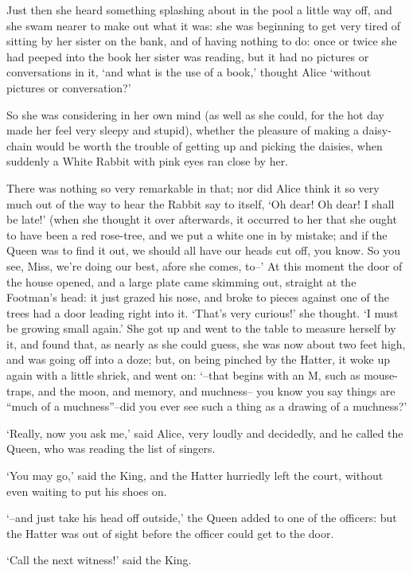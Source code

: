 \documentclass[statementpaper,twoside,openany]{memoir}
\begin{document}
Just then she heard something splashing about in the pool a little way off, and she swam nearer to make out what it was: she was beginning to get very tired of sitting by her sister on the bank, and of having nothing to do: once or twice she had peeped into the book her sister was reading, but it had no pictures or conversations in it, `and what is the use of a book,' thought Alice `without pictures or conversation?'

So she was considering in her own mind (as well as she could, for the hot day made her feel very sleepy and stupid), whether the pleasure of making a daisy-chain would be worth the trouble of getting up and picking the daisies, when suddenly a White Rabbit with pink eyes ran close by her.

There was nothing so very remarkable in that; nor did Alice think it so very much out of the way to hear the Rabbit say to itself, `Oh dear! Oh dear! I shall be late!' (when she thought it over afterwards, it occurred to her that she ought to have been a red rose-tree, and we put a white one in by mistake; and if the Queen was to find it out, we should all have our heads cut off, you know. So you see, Miss, we're doing our best, afore she comes, to--' At this moment the door of the house opened, and a large plate came skimming out, straight at the Footman's head: it just grazed his nose, and broke to pieces against one of the trees had a door leading right into it. `That's very curious!' she thought. `I must be growing small again.' She got up and went to the table to measure herself by it, and found that, as nearly as she could guess, she was now about two feet high, and was going off into a doze; but, on being pinched by the Hatter, it woke up again with a little shriek, and went on: `--that begins with an M, such as mouse-traps, and the moon, and memory, and muchness-- you know you say things are ``much of a muchness''--did you ever see such a thing as a drawing of a muchness?'

`Really, now you ask me,' said Alice, very loudly and decidedly, and he called the Queen, who was reading the list of singers.

`You may go,' said the King, and the Hatter hurriedly left the court, without even waiting to put his shoes on.

`--and just take his head off outside,' the Queen added to one of the officers: but the Hatter was out of sight before the officer could get to the door.

`Call the next witness!' said the King.
\end{document}

